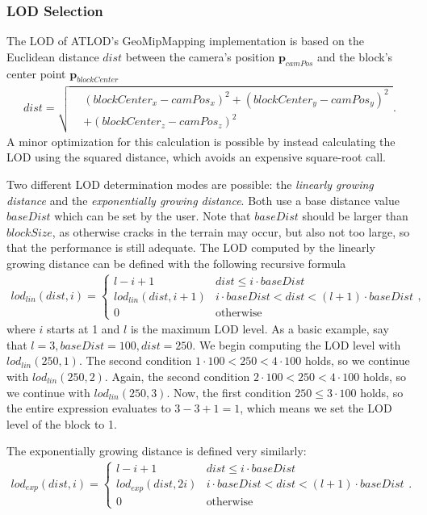 \subsubsection{LOD Selection}
The LOD of ATLOD's GeoMipMapping implementation is based on the Euclidean distance $dist$ between 
the camera's position $\mathbf{p}_{camPos}$ 
and the block's center point $\mathbf{p}_{blockCenter}$
\begin{align*}
  dist = \sqrt{ \begin{aligned} & (blockCenter_x - camPos_x)^2 + (blockCenter_y - camPos_y)^2 \\
          & + (blockCenter_z-camPos_z)^2 \end{aligned}}.
\end{align*}
A minor optimization for this calculation is possible by instead calculating the LOD using the squared distance, 
which avoids an expensive square-root call.

Two different LOD determination modes are possible: the \textit{linearly growing distance} and the \textit{exponentially growing distance}.
Both use a base distance value $baseDist$ which 
can be set by the user. Note that $baseDist$ should be larger than $blockSize$,
as otherwise cracks in the terrain may occur, but also not too large, 
so that the performance is still adequate.
The LOD computed by the linearly growing distance can be defined with the following recursive formula
\begin{align*}
  lod_{lin}(dist, i) = 
  \begin{cases}
    l - i  + 1& dist \leq i \cdot baseDist\\
    lod_{lin}(dist, i + 1) & i \cdot baseDist < dist < (l + 1) \cdot baseDist\\
    0 & \text{otherwise}
  \end{cases},
\end{align*}
where $i$ starts at 1 and $l$ is the maximum LOD level.
As a basic example, say that $l=3,baseDist=100,dist=250$.
We begin computing the LOD level with $lod_{lin}(250,1)$.
The second condition $1 \cdot 100 < 250 < 4 \cdot 100$ holds, so we continue with $lod_{lin}(250,2)$.
Again, the second condition $2 \cdot 100 < 250 < 4 \cdot 100$ holds, so we continue with $lod_{lin}(250,3)$.
Now, the first condition $250 \leq 3 \cdot 100$ holds, so the entire expression evaluates to $3-3+1=1$,
which means we set the LOD level of the block to 1.

The exponentially growing distance is defined very similarly:
\begin{align*}
  lod_{exp}(dist, i) = 
  \begin{cases}
    l - i + 1 & dist \leq i \cdot baseDist\\
    lod_{exp}(dist, 2i) & i \cdot baseDist < dist < (l+1) \cdot baseDist\\
    0 & \text{otherwise}
  \end{cases}.
\end{align*}

